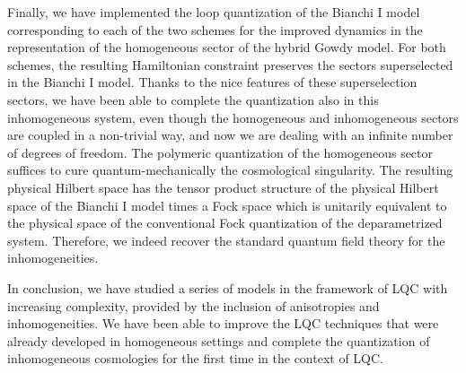 Finally, we have implemented the loop quantization of the Bianchi I model corresponding to
each of the two schemes for the improved dynamics in the representation of the homogeneous sector
of the hybrid Gowdy model. For both schemes, the resulting Hamiltonian constraint preserves the
sectors superselected in the Bianchi I model. Thanks to the nice features of these superselection
sectors, we have been able to complete the quantization also in this inhomogeneous system, even
though the homogeneous and inhomogeneous sectors are coupled in a non-trivial way, and now we are
dealing with an infinite number of degrees of freedom. The polymeric quantization of the homogeneous
sector suffices to cure quantum-mechanically the cosmological singularity.
The resulting physical Hilbert space has the
tensor product structure of the physical Hilbert space of the Bianchi I model times a Fock space
which is
unitarily equivalent to the physical space of the conventional Fock quantization of the
deparametrized system. Therefore, we indeed recover the standard quantum field theory for the
inhomogeneities.

In conclusion, we have studied a series of models in the framework of LQC with increasing
complexity, provided by the inclusion of anisotropies and inhomogeneities. We have been able
to improve the LQC techniques that were already developed in homogeneous settings and
complete the quantization of inhomogeneous cosmologies for the first time in the context of LQC.
\cleardoublepage
